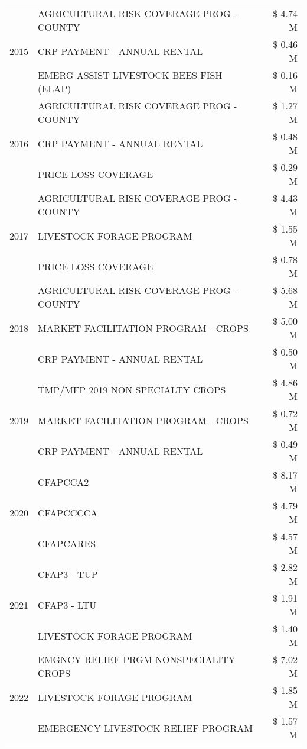 \begin{tabular}{llr}
\cline{1-3}
\multirow[t]{3}{*}{2015} & AGRICULTURAL RISK COVERAGE PROG - COUNTY & \$ 4.74 M \\
 & CRP PAYMENT - ANNUAL RENTAL & \$ 0.46 M \\
 & EMERG ASSIST LIVESTOCK BEES FISH (ELAP) & \$ 0.16 M \\
\cline{1-3}
\multirow[t]{3}{*}{2016} & AGRICULTURAL RISK COVERAGE PROG - COUNTY & \$ 1.27 M \\
 & CRP PAYMENT - ANNUAL RENTAL & \$ 0.48 M \\
 & PRICE LOSS COVERAGE & \$ 0.29 M \\
\cline{1-3}
\multirow[t]{3}{*}{2017} & AGRICULTURAL RISK COVERAGE PROG - COUNTY & \$ 4.43 M \\
 & LIVESTOCK FORAGE PROGRAM & \$ 1.55 M \\
 & PRICE LOSS COVERAGE & \$ 0.78 M \\
\cline{1-3}
\multirow[t]{3}{*}{2018} & AGRICULTURAL RISK COVERAGE PROG - COUNTY & \$ 5.68 M \\
 & MARKET FACILITATION PROGRAM - CROPS & \$ 5.00 M \\
 & CRP PAYMENT - ANNUAL RENTAL & \$ 0.50 M \\
\cline{1-3}
\multirow[t]{3}{*}{2019} & TMP/MFP 2019 NON SPECIALTY CROPS & \$ 4.86 M \\
 & MARKET FACILITATION PROGRAM - CROPS & \$ 0.72 M \\
 & CRP PAYMENT - ANNUAL RENTAL & \$ 0.49 M \\
\cline{1-3}
\multirow[t]{3}{*}{2020} & CFAPCCA2 & \$ 8.17 M \\
 & CFAPCCCCA & \$ 4.79 M \\
 & CFAPCARES & \$ 4.57 M \\
\cline{1-3}
\multirow[t]{3}{*}{2021} & CFAP3 - TUP & \$ 2.82 M \\
 & CFAP3 - LTU & \$ 1.91 M \\
 & LIVESTOCK FORAGE PROGRAM & \$ 1.40 M \\
\cline{1-3}
\multirow[t]{3}{*}{2022} & EMGNCY RELIEF PRGM-NONSPECIALITY CROPS & \$ 7.02 M \\
 & LIVESTOCK FORAGE PROGRAM & \$ 1.85 M \\
 & EMERGENCY LIVESTOCK RELIEF PROGRAM & \$ 1.57 M \\
\cline{1-3}
\bottomrule
\end{tabular}
